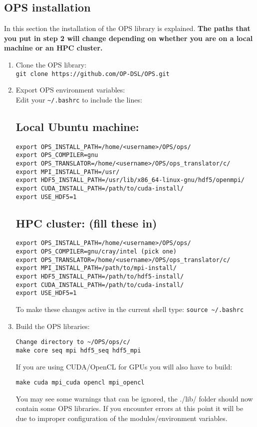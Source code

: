 \documentclass[11pt]{article}
\begin{document}
\subsection{OPS installation}\label{sec:OPS}
In this section the installation of the OPS library is explained. \textbf{The paths that you put in step 2 will change depending on whether you are on a local machine or an HPC cluster.}
\begin{enumerate}
\item{Clone the OPS library:\\ \verb|git clone https://github.com/OP-DSL/OPS.git|}
\item{Export OPS environment variables:\\ Edit your \verb|~/.bashrc| to include the lines:}
\subsection*{Local Ubuntu machine:}
\begin{verbatim}
export OPS_INSTALL_PATH=/home/<username>/OPS/ops/
export OPS_COMPILER=gnu
export OPS_TRANSLATOR=/home/<username>/OPS/ops_translator/c/
export MPI_INSTALL_PATH=/usr/
export HDF5_INSTALL_PATH=/usr/lib/x86_64-linux-gnu/hdf5/openmpi/
export CUDA_INSTALL_PATH=/path/to/cuda-install/
export USE_HDF5=1
\end{verbatim}

\subsection*{HPC cluster: (fill these in)}
\begin{verbatim}
export OPS_INSTALL_PATH=/home/<username>/OPS/ops/
export OPS_COMPILER=gnu/cray/intel (pick one)
export OPS_TRANSLATOR=/home/<username>/OPS/ops_translator/c/
export MPI_INSTALL_PATH=/path/to/mpi-install/
export HDF5_INSTALL_PATH=/path/to/hdf5-install/
export CUDA_INSTALL_PATH=/path/to/cuda-install/
export USE_HDF5=1
\end{verbatim}
To make these changes active in the current shell type: \verb|source ~/.bashrc|
\item{Build the OPS libraries:}
\begin{verbatim}
Change directory to ~/OPS/ops/c/
make core seq mpi hdf5_seq hdf5_mpi
\end{verbatim}
If you are using CUDA/OpenCL for GPUs you will also have to build:
\begin{verbatim}
make cuda mpi_cuda opencl mpi_opencl
\end{verbatim}
You may see some warnings that can be ignored, the ./lib/ folder should now contain some OPS libraries. If you encounter errors at this point it will be due to improper configuration of the modules/environment variables.
\end{enumerate}
\end{document}
